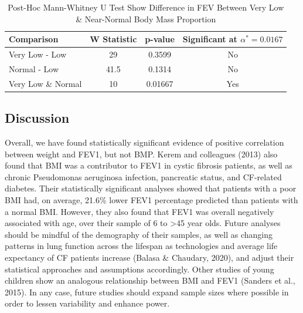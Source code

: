 \documentclass{article}
\begin{document}
		\begin{table}[h!]
			\centering
			\caption{Post-Hoc Mann-Whitney U Test Show Difference in FEV Between Very Low \& Near-Normal Body Mass Proportion}
			\footnotesize
			\begin{tabular}{l c c c}
			\toprule
			\textbf{Comparison} & \textbf{W Statistic} & \textbf{p-value} & \textbf{Significant at $\alpha^* = 0.0167$} \\
			\midrule
			Very Low - Low      & 29                   & 0.3599          & No  \\
			Normal - Low        & 41.5                 & 0.1314          & No  \\
			Very Low \& Normal  & 10                   & 0.01667         & Yes \\
			\bottomrule
			\end{tabular}
		\end{table}

		\subsection*{Discussion}
		Overall, we have found statistically significant evidence of positive correlation between weight and FEV1, but not BMP. Kerem and colleagues (2013) also found that BMI was a contributor to FEV1 in cystic fibrosis patients, as well as chronic Pseudomonas aeruginosa infection, pancreatic status, and CF-related diabetes. Their statistically significant analyses showed that patients with a poor BMI had, on average, 21.6\% lower FEV1 percentage predicted than patients with a normal BMI. However, they also found that FEV1 was overall negatively associated with age, over their sample of 6 to >45 year olds. Future analyses should be mindful of the demography of their samples, as well as changing patterns in lung function across the lifespan as technologies and average life expectancy of CF patients increase (Balasa \& Chaudary, 2020), and adjust their statistical approaches and assumptions accordingly. Other studies of young children show an analogous relationship between BMI and FEV1 (Sanders et al., 2015). In any case, future studies should expand sample sizes where possible in order to lessen variability and enhance power.
		
		\newpage
\end{document}
